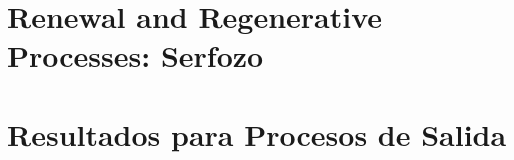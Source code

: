 \documentclass{article}
\begin{document}
\section{Renewal and Regenerative Processes: Serfozo\cite{Serfozo}}



\section{Resultados para Procesos de Salida}




\end{document}
